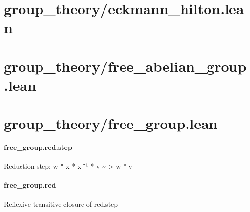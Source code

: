 \documentclass{article}
\begin{document}
\section{group\_theory/eckmann\_hilton.lean}\section{group\_theory/free\_abelian\_group.lean}\section{group\_theory/free\_group.lean}\paragraph{free\_group.red.step}
\par
Reduction step: 
\colorbox[RGB]{253,246,227}{{{{\color[RGB]{101, 123, 131} w  }}}{{{\color[RGB]{181, 137, 0} * }}}{{{\color[RGB]{101, 123, 131}  x  }}}{{{\color[RGB]{181, 137, 0} * }}}{{{\color[RGB]{101, 123, 131}  x }}}{{{\color[RGB]{181, 137, 0} ⁻¹ }}}{{{\color[RGB]{101, 123, 131}   }}}{{{\color[RGB]{181, 137, 0} * }}}{{{\color[RGB]{101, 123, 131}  v \textasciitilde{} }}}{{{\color[RGB]{181, 137, 0} > }}}{{{\color[RGB]{101, 123, 131}  w  }}}{{{\color[RGB]{181, 137, 0} * }}}{{{\color[RGB]{101, 123, 131}  v }}}}\paragraph{free\_group.red}
\par
Reflexive-transitive closure of red.step
\end{document}
